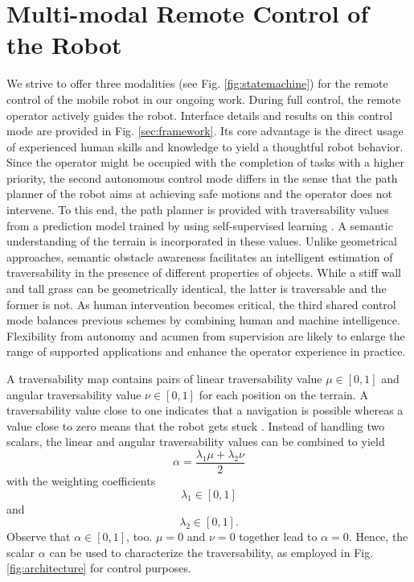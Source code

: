 \documentclass[letterpaper, 10 pt, conference]{ieeeconf}  %
\begin{document}
\section{Multi-modal Remote Control of the Robot}
We strive to offer three modalities (see Fig. \ref{fig:statemachine}) for the remote control of the mobile robot in our ongoing work. During  full control, the remote operator actively guides the robot. Interface details and  results on this control mode are provided in Fig. \ref{sec:framework}. Its core advantage is the direct usage of experienced human skills and knowledge to yield a thoughtful robot behavior. Since the operator might be occupied with the completion of  tasks with a higher priority, the second autonomous control mode differs  in the sense that the path planner of the robot aims at achieving safe motions and the operator does not intervene. To this end, the path planner is provided with traversability values from a prediction model trained by using self-supervised learning \cite{wayfaster}. A semantic understanding of the terrain  is incorporated in these values. Unlike geometrical approaches, semantic obstacle awareness facilitates an intelligent estimation of traversability in the presence of  different properties of objects. While a stiff wall and tall grass can be geometrically identical, the latter is traversable and the former is not. As human intervention becomes critical, the third shared control mode balances previous schemes by combining human and machine intelligence. Flexibility from autonomy and acumen from supervision are likely to enlarge the range of supported applications and enhance the operator experience in practice.

A traversability map  contains pairs of linear traversability value $\mu \in [0,1]$  and angular traversability value $\nu\in [0,1]$ for each position on the terrain. A traversability value close to one indicates that a navigation is possible whereas a value close to zero means that the robot  gets stuck \cite{wayfast}. Instead of handling two scalars, the linear and angular traversability values can be combined to yield 
\begin{equation}
	\alpha = \frac{\lambda_1 \mu + \lambda_2 \nu}{2}
\end{equation}
with the weighting coefficients
\begin{equation}
	\lambda_1 \in [0,1]
\end{equation}
and 
\begin{equation}
	\lambda_2 \in [0,1].
\end{equation}
Observe that $\alpha \in [0,1]$, too. $\mu = 0$ and $\nu = 0$ together lead  to $\alpha = 0$. Hence, the scalar $\alpha$ can be used to characterize the traversability, as employed in Fig. \ref{fig:architecture} for control purposes.
\end{document}
